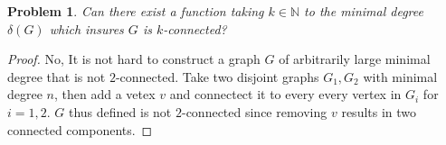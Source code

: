 \documentclass{article}
\newtheorem{prb}{Problem}
\begin{document}
\begin{prb} 

	Can there exist a function taking $k \in \mathbb{N}$ to the minimal degree $\delta(G)$ which insures $G$ is $k$-connected? 
\end{prb} 

\begin{proof} 
No, It is not hard to construct a graph $G$ of arbitrarily large minimal degree that is not $2$-connected. Take two disjoint graphs $G_1, G_2$ with minimal degree $n$, then add a vetex $v$ and connectect it to every every vertex in $G_i$ for $i = 1, 2$. $G$ thus defined is not $2$-connected since removing $v$ results in two connected components.  
\end{proof}
\end{document}
